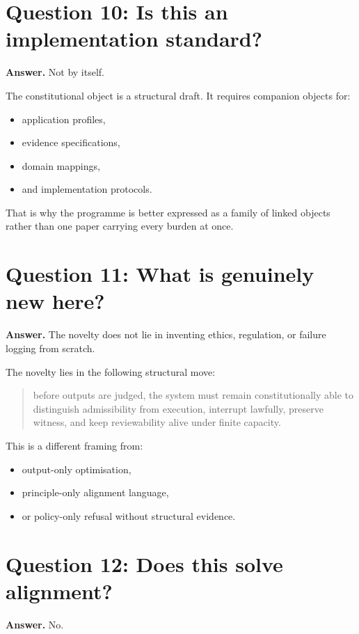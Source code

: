 \documentclass[11pt]{article}
\begin{document}
\section{Question 10: Is this an implementation standard?}

\textbf{Answer.} Not by itself.

The constitutional object is a structural draft. It requires companion objects for:
\begin{itemize}[leftmargin=2em]
    \item application profiles,
    \item evidence specifications,
    \item domain mappings,
    \item and implementation protocols.
\end{itemize}

That is why the programme is better expressed as a family of linked objects rather than one paper carrying every burden at once.

\section{Question 11: What is genuinely new here?}

\textbf{Answer.} The novelty does not lie in inventing ethics, regulation, or failure logging from scratch.

The novelty lies in the following structural move:
\begin{quote}
before outputs are judged, the system must remain constitutionally able to distinguish admissibility from execution, interrupt lawfully, preserve witness, and keep reviewability alive under finite capacity.
\end{quote}

This is a different framing from:
\begin{itemize}[leftmargin=2em]
    \item output-only optimisation,
    \item principle-only alignment language,
    \item or policy-only refusal without structural evidence.
\end{itemize}

\section{Question 12: Does this solve alignment?}

\textbf{Answer.} No.
\end{document}
